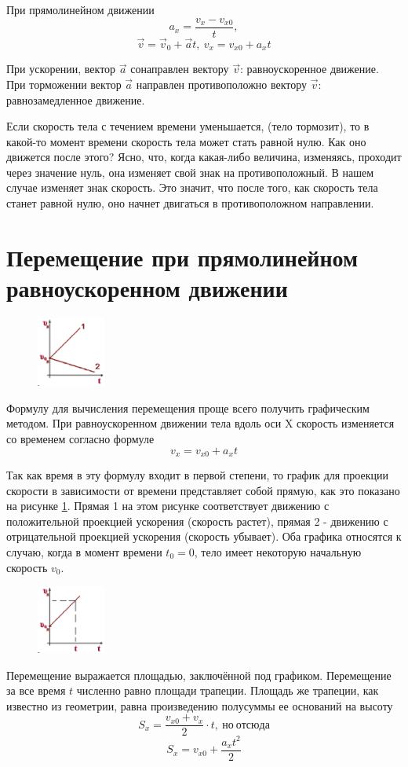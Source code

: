 \documentclass[a5paper, 10pt]{diss_4}
\renewcommand{\'}{\,'}
\begin{document}
 При прямолинейном движении
\[a_x=\frac{v_x-v_{x0}}{t},\]
\[\vec{v}=\vec{v}_0+\vec{a}t,\ v_x=v_{x0}+a_{x}t\]

 При ускорении, вектор $\vec{a}$ сонаправлен вектору $\vec{v}$: равноускоренное
движение. При торможении вектор $\vec{a}$ направлен противоположно вектору
$\vec{v}$: равнозамедленное движение.

 Если скорость тела с течением времени уменьшается, (тело тормозит), то в
какой-то момент времени скорость тела может стать равной нулю. Как оно
движется после этого? Ясно, что, когда какая-либо величина, изменяясь,
проходит через значение нуль, она изменяет свой знак на противоположный. В
нашем случае изменяет знак скорость. Это значит, что после того, как скорость
тела станет равной нулю, оно начнет двигаться в противоположном направлении.


\section{Перемещение при прямолинейном равноускоренном движении}

\begin{figure}
\includegraphics[width=0.2\textwidth]{img/img11.eps}
\caption{}
\label{fig11}
\end{figure}
  Формулу для вычисления перемещения проще всего получить графическим
методом. При равноускоренном движении тела вдоль оси X скорость изменяется со
временем согласно формуле \[{v}_x={v}_{x0}+a_{x}t\]

Так как время в эту формулу входит в первой степени,
то график для проекции скорости в зависимости от времени представляет собой
прямую, как это показано на рисунке \ref{fig11}. Прямая 1 на этом рисунке соответствует
движению с положительной проекцией ускорения (скорость растет), прямая 2 -
движению с отрицательной проекцией ускорения (скорость убывает). Оба графика
относятся к случаю, когда в момент времени $t_0 = 0$, тело имеет некоторую
начальную скорость $v_0$.
\begin{figure}
\includegraphics[width=0.2\textwidth]{img/img12.eps}
\caption{}
\label{fig12}
\end{figure}
Перемещение выражается площадью, заключённой под
графиком. Перемещение за все время $t$ численно равно площади трапеции. Площадь
же трапеции, как известно из геометрии, равна произведению полусуммы ее
оснований на высоту
\[S_x=\frac{v_{x0}+v_x}{2}\cdot t,\  но\ отсюда \]
\[S_x=v_{x0}+\frac{a_x t^2}{2}\]
\end{document}
